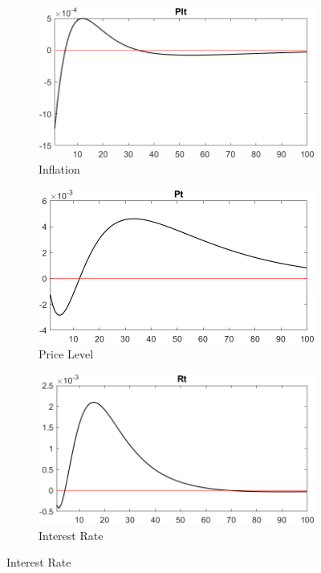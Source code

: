 \documentclass[
	12pt, 
	]{article}
\numberwithin{equation}{section}
\theoremstyle{definition}
\theoremstyle{plain}
\theoremstyle{plain}
\theoremstyle{plain}
\begin{document}
\begin{figure}[h!]
\vspace*{0.5cm}

\begin{subfigure}[b]{0.3\textwidth}
	\centering
	\includegraphics[width=\textwidth]{shock_ZAt/shock_ZAt_PIt}
	\caption{Inflation}
	\label{fig:zat-inflation}
\end{subfigure}
\hfill
\begin{subfigure}[b]{0.3\textwidth}
	\centering
	\includegraphics[width=\textwidth]{shock_ZAt/shock_ZAt_Pt}
	\caption{Price Level}
	\label{fig:zat-price}
\end{subfigure}
\hfill
\begin{subfigure}[b]{0.3\textwidth}
	\centering
	\includegraphics[width=\textwidth]{shock_ZAt/shock_ZAt_Rt}
	\caption{Interest Rate}
	\label{fig:zat-interest-rate}
\end{subfigure}
\hfill


\end{figure}
\end{document}
